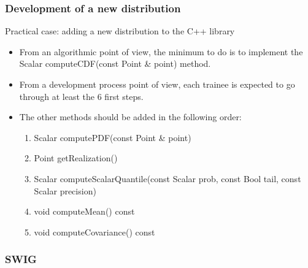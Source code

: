 \documentclass[8pt]{beamer}
\begin{document}
\begin{frame}
  \frametitle{Development of a new distribution}
  \begin{block}{Practical case: adding a new distribution to the C++ library}
    \begin{itemize}
    \item From an algorithmic point of view, the minimum to do is to implement the {\ttfamily Scalar computeCDF(const Point \& point)} method.
    \item From a development process point of view, each trainee is expected to go through at least the 6 first steps.
    \item The other methods should be added in the following order:
      \begin{enumerate}
      \item {\ttfamily Scalar computePDF(const Point \& point)}
      \item {\ttfamily Point getRealization()}
      \item {\ttfamily Scalar computeScalarQuantile(const Scalar prob, const Bool tail, const Scalar precision)}
      \item {\ttfamily void computeMean() const}
      \item {\ttfamily void computeCovariance() const}
      \end{enumerate}
    \end{itemize}
  \end{block}
\end{frame}


\begin{frame}
  \frametitle{SWIG}
  \tableofcontents[part=1]
\end{frame}
\end{document}
